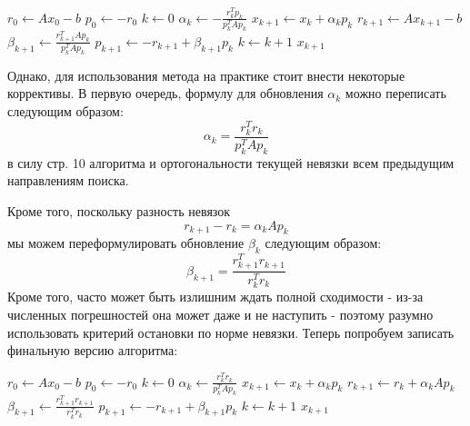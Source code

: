     \begin{algorithm}[H]
        \begin{algorithmic}[1]
            \State $r_0 \gets Ax_0 - b$
            \State $p_0 \gets -r_0$
            \State $k \gets 0$
                \State $\alpha_k \gets -\frac{r_k^T p_k}{p_k^T A p_k}$
                \State $x_{k+1} \gets x_k + \alpha_k p_k$
                \State $r_{k+1} \gets Ax_{k+1} -b$
                \State $\beta_{k+1} \gets \frac{r_{k+1}^T A p_k}{p_k^T A p_k}$
                \State $p_{k+1} \gets -r_{k+1} + \beta_{k+1} p_k$
                \State $k \gets k+1$
            \EndWhile
            \State \Return $x_{k+1}$
            \EndProcedure
        \end{algorithmic}
    \end{algorithm}
Однако, для использования метода на практике стоит внести некоторые коррективы. В первую очередь, формулу для обновления $\alpha_k$ можно переписать следующим образом: $$\alpha_k = \frac{r_k^T r_k}{p_k^T A p_k}$$ в силу стр. 10 алгоритма и ортогональности текущей невязки всем предыдущим направлениям поиска.

Кроме того, поскольку разность невязок $$r_{k+1} - r_k = \alpha_k A p_k$$ мы можем переформулировать обновление $\beta_k$ следующим образом: $$\beta_{k+1} = \frac{r_{k+1}^T r_{k+1}}{r_k^T r_k}$$ Кроме того, часто может быть излишним ждать полной сходимости - из-за численных погрешностей она может даже и не наступить - поэтому разумно использовать критерий остановки по норме невязки. Теперь попробуем записать финальную версию алгоритма:

     \begin{algorithm}[H]
        \begin{algorithmic}[1]
            \State $r_0 \gets Ax_0 - b$
            \State $p_0 \gets -r_0$
            \State $k \gets 0$
                \State $\alpha_k \gets \frac{r_k^T r_k}{p_k^T A p_k}$
                \State $x_{k+1} \gets x_k + \alpha_k p_k$
                \State $r_{k+1} \gets r_k + \alpha_k A p_k$
                \State $\beta_{k+1} \gets \frac{r_{k+1}^T r_{k+1}}{r_k^T r_k}$
                \State $p_{k+1} \gets -r_{k+1} + \beta_{k+1} p_k$
                \State $k \gets k+1$
            \EndWhile
            \State \Return $x_{k+1}$
            \EndProcedure
        \end{algorithmic}
    \end{algorithm}

